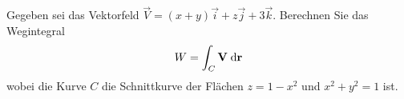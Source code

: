 \begin{atiTask}[
  title = Wegintegrale berechnen
]
Gegeben sei das Vektorfeld $\vec{V}=(x+y)\vec{i}+z\vec{j}+3\vec{k}$. Berechnen Sie das Wegintegral
\begin{equation*}
W=\int_C \mathbf{V} \;\mathrm{d}\mathbf{r}
\end{equation*}
wobei die Kurve $C$ die Schnittkurve der Flächen $z=1-x^2$ und $x^2+y^2=1$ ist. \end{atiTask}

